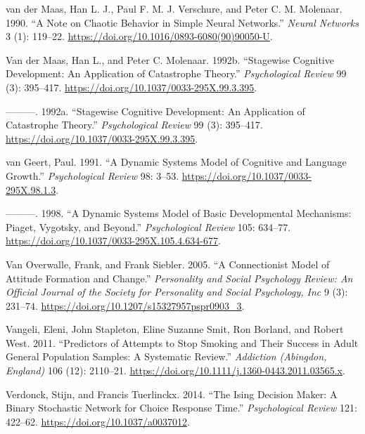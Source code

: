 \documentclass[
  a4paper,
  DIV=11,
  numbers=noendperiod]{scrreprt}
\newlength{\cslhangindent}
\newlength{\cslentryspacingunit} %
\newenvironment{CSLReferences}[2] %
 {%
  \setlength{\parindent}{0pt}
  \ifodd #1
  \let\oldpar\par
  \def\par{\hangindent=\cslhangindent\oldpar}
  \fi
  \setlength{\parskip}{#2\cslentryspacingunit}
 }%
 {}
\begin{document}
\begin{CSLReferences}{1}{0}
\leavevmode{}%
van der Maas, Han L. J., Paul F. M. J. Verschure, and Peter C. M.
Molenaar. 1990. {``A Note on Chaotic Behavior in Simple Neural
Networks.''} \emph{Neural Networks} 3 (1): 119--22.
\url{https://doi.org/10.1016/0893-6080(90)90050-U}.

\leavevmode{}%
Van der Maas, Han L., and Peter C. Molenaar. 1992b. {``Stagewise
Cognitive Development: {An} Application of Catastrophe Theory.''}
\emph{Psychological Review} 99 (3): 395--417.
\url{https://doi.org/10.1037/0033-295X.99.3.395}.

\leavevmode{}%
---------. 1992a. {``Stagewise Cognitive Development: An Application of
Catastrophe Theory.''} \emph{Psychological Review} 99 (3): 395--417.
\url{https://doi.org/10.1037/0033-295X.99.3.395}.

\leavevmode{}%
van Geert, Paul. 1991. {``A Dynamic Systems Model of Cognitive and
Language Growth.''} \emph{Psychological Review} 98: 3--53.
\url{https://doi.org/10.1037/0033-295X.98.1.3}.

\leavevmode{}%
---------. 1998. {``A Dynamic Systems Model of Basic Developmental
Mechanisms: {Piaget}, {Vygotsky}, and Beyond.''} \emph{Psychological
Review} 105: 634--77.
\url{https://doi.org/10.1037/0033-295X.105.4.634-677}.

\leavevmode{}%
Van Overwalle, Frank, and Frank Siebler. 2005. {``A Connectionist Model
of Attitude Formation and Change.''} \emph{Personality and Social
Psychology Review: An Official Journal of the Society for Personality
and Social Psychology, Inc} 9 (3): 231--74.
\url{https://doi.org/10.1207/s15327957pspr0903_3}.

\leavevmode{}%
Vangeli, Eleni, John Stapleton, Eline Suzanne Smit, Ron Borland, and
Robert West. 2011. {``Predictors of Attempts to Stop Smoking and Their
Success in Adult General Population Samples: A Systematic Review.''}
\emph{Addiction (Abingdon, England)} 106 (12): 2110--21.
\url{https://doi.org/10.1111/j.1360-0443.2011.03565.x}.

\leavevmode{}%
Verdonck, Stijn, and Francis Tuerlinckx. 2014. {``The {Ising Decision
Maker}: {A} Binary Stochastic Network for Choice Response Time.''}
\emph{Psychological Review} 121: 422--62.
\url{https://doi.org/10.1037/a0037012}.


\end{CSLReferences}
\end{document}
